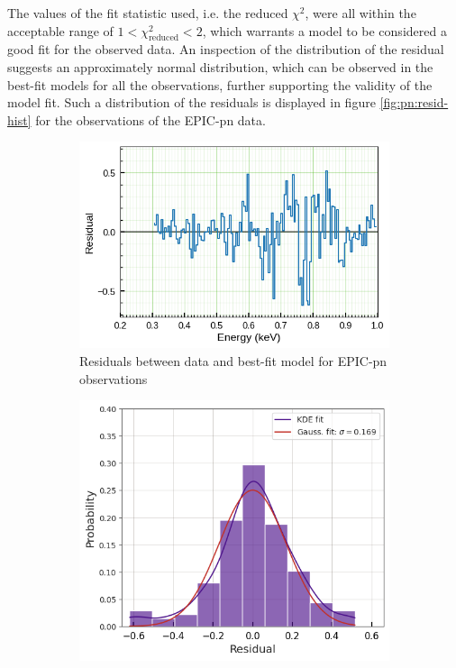 	The values of the fit statistic used, i.e. the reduced $\chi^2$, were all within the acceptable range of $1<\chi^2_\text{reduced}<2$, which warrants a model to be considered a good fit for the observed data. An inspection of the distribution of the residual suggests an approximately normal distribution, which can be observed in the best-fit models for all the observations, further supporting the validity of the model fit. Such a distribution of the residuals is displayed in figure \ref{fig:pn:resid-hist} for the observations of the EPIC-pn data.
	
	\begin{figure}[!htb]
        \centering
        \begin{subfigure}[b]{0.51\textwidth}
            \includegraphics[width=\textwidth]{figures/resid/mr-vel-0111150101-pn_resid.png}
            \caption{Residuals between data and best-fit model for EPIC-pn observations}
            \label{fig:pn:resid}
        \end{subfigure}
        \hfill
        \begin{subfigure}[b]{0.39\textwidth}
            \includegraphics[width=\textwidth]{figures/resid/mr-vel-0111150101-pn_resid-hist.png}

\end{subfigure}
\end{figure}
